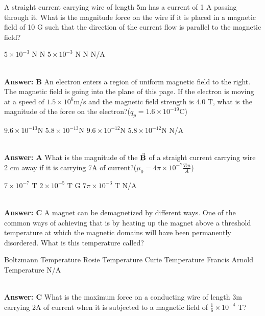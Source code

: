 \documentclass[12pt,addpoints]{exam}
\begin{document}
{{{\begin{questions}
					\question A straight current carrying wire of length 5m has a current of 1 A passing through it. What is the magnitude force on the wire if it is placed in a magnetic field of 10 G such that the direction of the current flow is parallel to the magnetic field?\\ \begin{oneparchoices}
						\choice $5\times10^{-3}$ N
						\choice 0 N
						\choice $5\times10^{-3}$ N
						\choice 1 N
						\choice N/A
					\end{oneparchoices}\\ \textbf{Answer: B}
					\question An electron enters a region of uniform magnetic field to the right. The magnetic field is going into the plane of this page. If the electron is moving at a speed of $1.5\times10^6$m/s and the magnetic field strength is 4.0 T, what is the magnitude of the force on the electron?($q_p=1.6\times10^{-19}$C)\\ \begin{oneparchoices}
						\choice $9.6\times10^{-13}$N
						\choice $5.8\times10^{-13}$N
						\choice $9.6\times10^{-12}$N
						\choice $5.8\times10^{-12}$N
						\choice N/A
					\end{oneparchoices}\\ \textbf{Answer: A}
					\question What is the magnitude of the $\vec{\bf B}$ of a straight current carrying wire 2 cm away if it is carrying 7A of current?($\mu_0=4\pi\times10^{-7}\frac{Tm}{A}$)\\ \begin{oneparchoices}
						\choice $7\times10^{-7}$ T
						\choice $2\times10^{-5}$ T
						.7 G
						\choice $7\pi\times10^{-3}$ T
						\choice N/A
					\end{oneparchoices}\\ \textbf{Answer: C}
					\question A magnet can be demagnetized by different ways. One of the common ways of achieving that is by heating up the magnet above a threshold temperature at which the magnetic domains will have been permanently disordered. What is this temperature called? \\ 
					\begin{oneparchoices}
						\choice Boltzmann Temperature
						\choice Rosie Temperature
						\choice Curie Temperature
						\choice Francis Arnold Temperature
						\choice N/A
					\end{oneparchoices}\\ \textbf{Answer: C}
					\question What is the maximum force on a conducting wire of length 3m carrying 2A of current when it is subjected to a magnetic field of $\frac{1}{6}\times10^{-4}$ T?\\ \begin{oneparchoices}

\end{oneparchoices}
\end{questions}}}}
\end{document}
